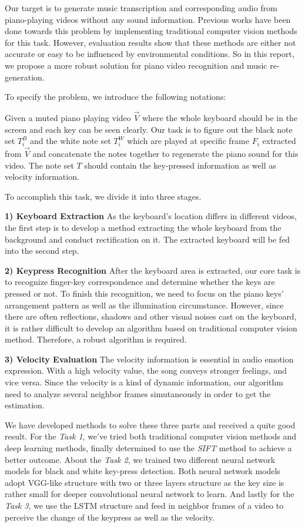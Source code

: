 \documentclass[10pt,twocolumn,letterpaper]{article}
\begin{document}
   Our target is to generate music transcription and corresponding audio from piano-playing videos without any sound information.
   Previous works have been done towards this problem by implementing traditional computer vision methods for this task.
   However, evaluation results show that these methods are either not accurate or easy to be influenced by environmental conditions.
   So in this report, we propose a more robust solution for piano video recognition and music re-generation.

   To specify the problem, we introduce the following notations:

   Given a muted piano playing video $\vec{V}$ where the whole keyboard should be in the screen and each key can be seen clearly.
   Our task is to figure out the black note set $T_i^B$ and the white note set $T_i^W$ which are played at specific frame $F_i$ extracted from $\vec{V}$ and concatenate the notes together to regenerate the piano sound for this video.
   The note set $T$ should contain the key-pressed information as well as velocity information.
   
   To accomplish this task, we divide it into three stages.

   \textbf{1) Keyboard Extraction}
   As the keyboard's location differs in different videos, the first step is to develop a method extracting the whole keyboard from the background and conduct rectification on it. 
   The extracted keyboard will be fed into the second step.

   \textbf{2) Keypress Recognition}
   After the keyboard area is extracted, our core task is to recognize finger-key correspondence and determine whether the keys are pressed or not. 
   To finish this recognition, we need to focus on the piano keys' arrangement pattern as well as the illumination circumstance.
   However, since there are often reflections, shadows and other visual noises cast on the keyboard, it is rather difficult to develop an algorithm based on traditional computer vision method.
   Therefore, a robust algorithm is required.

   \textbf{3) Velocity Evaluation}
   The velocity information is essential in audio emotion expression. 
   With a high velocity value, the song conveys stronger feelings, and vice versa. 
   Since the velocity is a kind of dynamic information, our algorithm need to analyze several neighbor frames simutaneously in order to get the estimation.

   We have developed methods to solve these three parts and received a quite good result. 
   For the \textit{Task 1}, we've tried both traditional computer vision methods and deep learning methods, finally determined to use the \textit{SIFT} method \cite{SIFT} to achieve a better outcome.
   About the \textit{Task 2}, we trained two different neural network models for black and white key-press detection. 
   Both neural network models adopt VGG-like structure\cite{VGG} with two or three layers structure as the key size is rather small for deeper convolutional neural network to learn.
   And lastly for the \textit{Task 3}, we use the LSTM structure \cite{LSTM} and feed in neighbor frames of a video to perceive the change of the keypress as well as the velocity.
\end{document}
